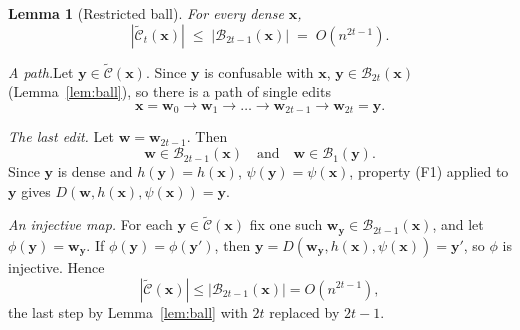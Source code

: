 \documentclass[journal,10pt]{IEEEtran}
\newtheorem{lemma}{Lemma}
\newcommand{\step}[1]{\par\smallskip\noindent\emph{#1}\enspace}
\newcommand{\B}{\mathcal{B}}
\newcommand{\Ct}{\widetilde{\mathcal{C}}}
\newcommand{\bx}{\mathbf{x}}
\newcommand{\by}{\mathbf{y}}
\newcommand{\bw}{\mathbf{w}}
\begin{document}
\begin{lemma}[Restricted ball]\label{lem:restricted}
For every dense $\bx$,
\[
|\Ct_t(\bx)|\;\le\;|\B_{2t-1}(\bx)|\;=\;O(n^{2t-1}).
\]
\end{lemma}
\begin{IEEEproof}
\emph{A path.}\enspace Let $\by\in\Ct(\bx)$. Since $\by$ is confusable with $\bx$, $\by\in\B_{2t}(\bx)$ (Lemma~\ref{lem:ball}), so there is a path of single edits
\[
\bx=\bw_0\to\bw_1\to\dots\to\bw_{2t-1}\to\bw_{2t}=\by .
\]

\step{The last edit.} Let $\bw=\bw_{2t-1}$. Then
\[
\bw\in\B_{2t-1}(\bx)\quad\text{and}\quad\bw\in\B_1(\by).
\]
Since $\by$ is dense and $h(\by)=h(\bx)$, $\psi(\by)=\psi(\bx)$, property (F1) applied to $\by$ gives $D(\bw,h(\bx),\psi(\bx))=\by$.

\step{An injective map.} For each $\by\in\Ct(\bx)$ fix one such $\bw_{\by}\in\B_{2t-1}(\bx)$, and let $\phi(\by)=\bw_{\by}$. If $\phi(\by)=\phi(\by')$, then $\by=D(\bw_{\by},h(\bx),\psi(\bx))=\by'$, so $\phi$ is injective. Hence
\[
|\Ct(\bx)|\le|\B_{2t-1}(\bx)|=O(n^{2t-1}),
\]
the last step by Lemma~\ref{lem:ball} with $2t$ replaced by $2t-1$.
\end{IEEEproof}
\end{document}
